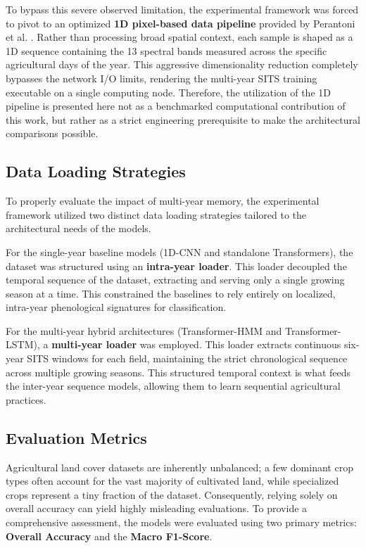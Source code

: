 To bypass this severe observed limitation, the experimental framework was forced to pivot to an optimized \textbf{1D pixel-based data pipeline}
provided by Perantoni et al. \cite{perantoni_bayesian_2024}.
Rather than processing broad spatial context, each sample is shaped as a 1D sequence containing the 13 spectral
bands measured across the specific agricultural days of the year.
This aggressive dimensionality reduction completely bypasses the network I/O limits,
rendering the multi-year SITS training executable on a single computing node.
Therefore, the utilization of the 1D pipeline is presented here not as a benchmarked computational contribution of this work,
but rather as a strict engineering prerequisite to make the architectural comparisons possible.


\subsection{Data Loading Strategies}
\label{subsec:data_loading}

To properly evaluate the impact of multi-year memory, the experimental framework utilized two distinct data loading
strategies tailored to the architectural needs of the models. 

For the single-year baseline models (1D-CNN and standalone Transformers), the dataset was structured using an \textbf{intra-year loader}.
This loader decoupled the temporal sequence of the dataset, extracting and serving only a single growing season at a time.
This constrained the baselines to rely entirely on localized, intra-year phenological signatures for classification.

For the multi-year hybrid architectures (Transformer-HMM and Transformer-LSTM), a \textbf{multi-year loader} was employed.
This loader extracts continuous six-year SITS windows for each field,
maintaining the strict chronological sequence across multiple growing seasons.
This structured temporal context is what feeds the inter-year sequence models,
allowing them to learn sequential agricultural practices.

\subsection{Evaluation Metrics}
\label{subsec:evaluation_metrics}

Agricultural land cover datasets are inherently unbalanced; a few dominant crop types often account for the vast majority of cultivated land,
while specialized crops represent a tiny fraction of the dataset.
Consequently, relying solely on overall accuracy can yield highly misleading evaluations.
To provide a comprehensive assessment, the models were evaluated using two primary metrics: \textbf{Overall Accuracy} and the \textbf{Macro F1-Score}.

